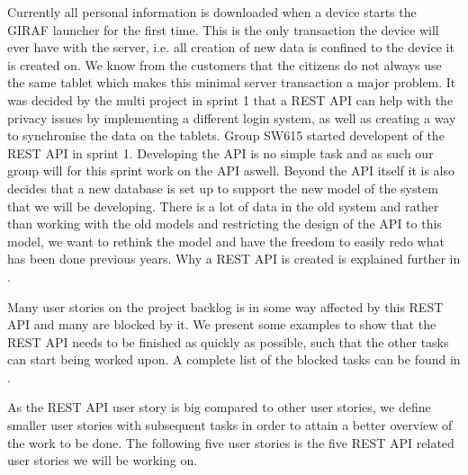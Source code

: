 Currently all personal information is downloaded when a device starts the GIRAF launcher for the first time.
This is the only transaction the device will ever have with the server, i.e. all creation of new data is confined to the device it is created on.
We know from the customers that the citizens do not always use the same tablet which makes this minimal server transaction a major problem.
It was decided by the multi project in sprint 1 that a REST API can help with the privacy issues by implementing a different login system, as well as creating a way to synchronise the data on the tablets.
Group SW615 started developent of the REST API in sprint 1.
Developing the API is no simple task and as such our group will for this sprint work on the API aswell.
Beyond the API itself it is also decides that a new database is set up to support the new model of the system that we will be developing.
There is a lot of data in the old system and rather than working with the old models and restricting the design of the API to this model, we want to rethink the model and have the freedom to easily redo what has been done previous years.
Why a REST API is created is explained further in .

Many user stories on the project backlog is in some way affected by this REST API and many are blocked by it.
We present some examples to show that the REST API needs to be finished as quickly as possible, such that the other tasks can start being worked upon.
A complete list of the blocked tasks can be found in . 

As the REST API user story is big compared to other user stories, we define smaller user stories with subsequent tasks in order to attain a better overview of the work to be done.
The following five user stories is the five REST API related user stories we will be working on.

